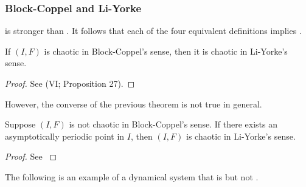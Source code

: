 \documentclass[10pt,twoside,draft]{book}
\begin{document}
\subsubsection*{Block-Coppel and Li-Yorke}
\blcp is stronger than \liy.
It follows that each of the four equivalent definitions implies \liy.
\begin{theorem}
  If $(I,F)$ is chaotic in Block-Coppel's sense, then it is chaotic in Li-Yorke's sense.
  \label{thm:blcp-liy}
  \begin{proof}
    See \citet{blockcoppel} (VI; Proposition 27).
  \end{proof}
\end{theorem}
However, the converse of the previous theorem is not true in general.
\begin{theorem}
  Suppose $(I,F)$ is not chaotic in Block-Coppel's sense.
  If there exists an asymptotically periodic point in $I$, then $(I,F)$ is chaotic in Li-Yorke's sense.
  \label{thm:blcp-per-liy}
  \begin{proof}
    See \citep[p.136]{blockcoppel}
  \end{proof}
\end{theorem}
The following is an example of a dynamical system that is \liy but not \blcp.
\end{document}
